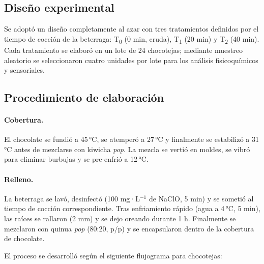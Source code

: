 \documentclass[manuscript,screen,review]{acmart}
\begin{document}
           
    \subsection{Diseño experimental}
    Se adoptó un diseño completamente al azar con tres tratamientos definidos por el tiempo de cocción de la beterraga:  
    T\textsubscript{0} (0 min, cruda),  
    T\textsubscript{1} (20 min) y  
    T\textsubscript{2} (40 min).  
    Cada tratamiento se elaboró en un lote de 24 chocotejas; mediante muestreo aleatorio se seleccionaron cuatro unidades por lote para los análisis fisicoquímicos y sensoriales.
    
    \subsection{Procedimiento de elaboración}
    \paragraph{Cobertura.} El chocolate se fundió a 45\,°C, se atemperó a 27\,°C y finalmente se estabilizó a 31\,°C antes de mezclarse con kiwicha \emph{pop}.  
    La mezcla se vertió en moldes, se vibró para eliminar burbujas y se pre-enfrió a 12\,°C.
    
    \paragraph{Relleno.} La beterraga se lavó, desinfectó (100 mg·L\(^{-1}\) de NaClO, 5 min) y se sometió al tiempo de cocción correspondiente. Tras enfriamiento rápido (agua a 4\,°C, 5 min), las raíces se rallaron (2 mm) y se dejo oreando durante 1 h. Finalmente se mezclaron con quinua \emph{pop} (80:20, p/p) y se encapsularon dentro de la cobertura de chocolate.

                    El proceso se desarrolló según el siguiente flujograma para chocotejas:
                    
\end{document}
